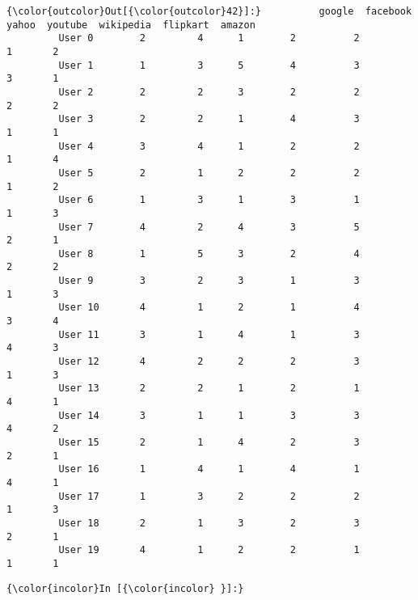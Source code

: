 \documentclass{article}
\begin{document}
            \begin{Verbatim}[commandchars=\\\{\}]
{\color{outcolor}Out[{\color{outcolor}42}]:}          google  facebook  yahoo  youtube  wikipedia  flipkart  amazon
         User 0        2         4      1        2          2         1       2
         User 1        1         3      5        4          3         3       1
         User 2        2         2      3        2          2         2       2
         User 3        2         2      1        4          3         1       1
         User 4        3         4      1        2          2         1       4
         User 5        2         1      2        2          2         1       2
         User 6        1         3      1        3          1         1       3
         User 7        4         2      4        3          5         2       1
         User 8        1         5      3        2          4         2       2
         User 9        3         2      3        1          3         1       3
         User 10       4         1      2        1          4         3       4
         User 11       3         1      4        1          3         4       3
         User 12       4         2      2        2          3         1       3
         User 13       2         2      1        2          1         4       1
         User 14       3         1      1        3          3         4       2
         User 15       2         1      4        2          3         2       1
         User 16       1         4      1        4          1         4       1
         User 17       1         3      2        2          2         1       3
         User 18       2         1      3        2          3         2       1
         User 19       4         1      2        2          1         1       1
\end{Verbatim}
        
    \begin{Verbatim}[commandchars=\\\{\}]
{\color{incolor}In [{\color{incolor} }]:} 
\end{Verbatim}


    
    
    
    
\end{document}
